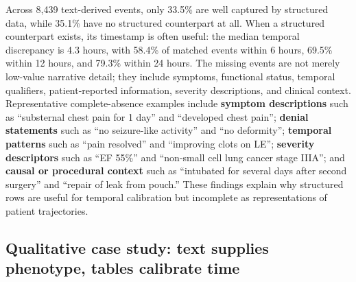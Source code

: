 \documentclass{ws-procs11x85}
\begin{document}
Across 8,439 text-derived events, only 33.5\% are well captured by structured data, while 35.1\% have no structured counterpart at all. When a structured counterpart exists, its timestamp is often useful: the median temporal discrepancy is 4.3 hours, with 58.4\% of matched events within 6 hours, 69.5\% within 12 hours, and 79.3\% within 24 hours. The missing events are not merely low-value narrative detail; they include symptoms, functional status, temporal qualifiers, patient-reported information, severity descriptions, and clinical context. Representative complete-absence examples include \textbf{symptom descriptions} such as ``substernal chest pain for 1 day'' and ``developed chest pain''; \textbf{denial statements} such as ``no seizure-like activity'' and ``no deformity''; \textbf{temporal patterns} such as ``pain resolved'' and ``improving clots on LE''; \textbf{severity descriptors} such as ``EF 55\%'' and ``non-small cell lung cancer stage IIIA''; and \textbf{causal or procedural context} such as ``intubated for several days after second surgery'' and ``repair of leak from pouch.'' These findings explain why structured rows are useful for temporal calibration but incomplete as representations of patient trajectories.

\vspace{-1.em}
\subsection{Qualitative case study: text supplies phenotype, tables calibrate time}
\label{sec:vignette_results}
\vspace{-0.5em}





\end{document}
